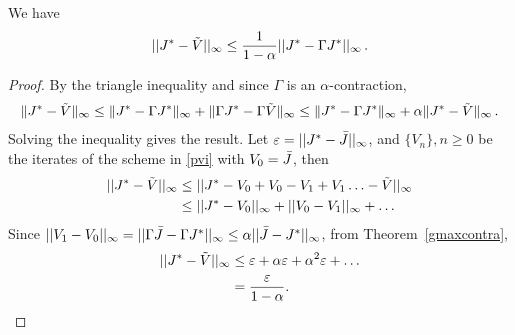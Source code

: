 \begin{theorem}\label{fxpres}
We have 
\begin{align}
||J^*-\tilde{V}||_\infty\leq \frac{1}{1-\alpha}||J^*-\Gamma J^*||_\infty\,.
\end{align}
\end{theorem}
\begin{proof}
By the triangle inequality and since $\Gamma$ is an $\alpha$-contraction,
\begin{align*}
\|J^* - \tilde{V} \|_{\infty} \le \| J^* - \Gamma J^* \|_{\infty} + \|\Gamma J^* - \Gamma \tilde{V} \|_{\infty}
\le  \| J^* - \Gamma J^* \|_{\infty} + \alpha \|J^* - \tilde{V}\|_{\infty}\,.
\end{align*}
Solving the inequality gives the result.
Let $\varepsilon=||J^*-\bar{J}||_\infty$, and $\{V_n\},n\geq 0$ be the iterates of the scheme in \eqref{pvi} with $V_0=\bar{J}$, then
\begin{align}
||J^*-\tilde{V}||_\infty&\leq ||J^*-V_0+V_0-V_1+V_1\ldots-\tilde{V}||_\infty\nonumber\\
&\leq ||J^*-V_0||_\infty+||V_0-V_1||_\infty+\ldots\nonumber
\end{align}
Since $||V_1-V_0||_\infty=||\Gamma \bar{J}-\Gamma J^*||_\infty\leq\alpha||\bar{J}-J^*||_\infty$, from Theorem~\ref{gmaxcontra},
\begin{align}
||J^*-\tilde{V}||_\infty&\leq \varepsilon+\alpha\varepsilon+\alpha^2\varepsilon+\ldots\nonumber\\
&=\frac{\varepsilon}{1-\alpha}.
\end{align}
\fi
\end{proof}
